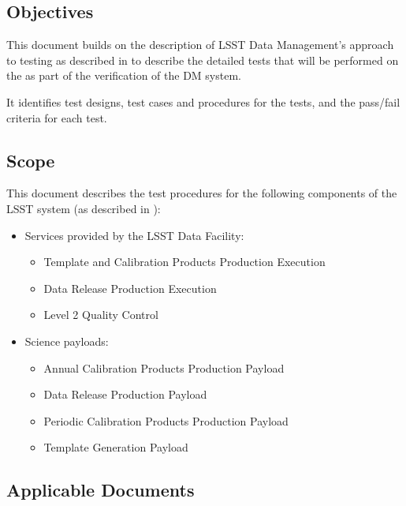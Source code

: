 \documentclass[DM,STS,toc]{lsstdoc}
\begin{document}
\subsection{Objectives}
\label{sec:objectives}

This document builds on the description of LSST Data Management's approach to
testing as described in  to describe the detailed tests that
will be performed on the \product{} as part of the verification of the DM system.

It identifies test designs, test cases and procedures for the tests, and the
pass/fail criteria for each test.

\subsection{Scope}
\label{sec:scope}

This document describes the test procedures for the following components of
the LSST system (as described in ):

\begin{itemize}

  \item{Services provided by the LSST Data Facility:

    \begin{itemize}
      \item{Template and Calibration Products Production Execution}
      \item{Data Release Production Execution}
      \item{Level 2 Quality Control}
    \end{itemize}
  }

  \item{Science payloads:

    \begin{itemize}
      \item{Annual Calibration Products Production Payload}
      \item{Data Release Production Payload}
      \item{Periodic Calibration Products Production Payload}
      \item{Template Generation Payload}
    \end{itemize}

  }

\end{itemize}

\subsection{Applicable Documents}
\label{sec:docs}
\end{document}
